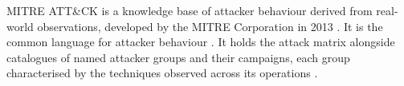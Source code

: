 \documentclass{cshonours}
\begin{document}
MITRE ATT\&CK is a knowledge base of attacker behaviour derived from
real-world observations, developed by the MITRE Corporation in 2013
\citep{strom2018mitre}. It is the common language for attacker behaviour
\citep{ferraz2026, buchel2025}. It holds the attack matrix alongside
catalogues of named attacker groups and their campaigns,
each group characterised by the techniques observed across its operations
\citep{mitre2026attackkb, alsada2024}.
\end{document}
